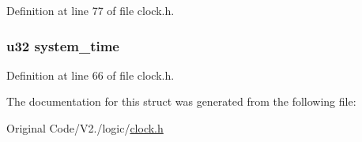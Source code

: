\-Definition at line 77 of file clock.\-h.

\hypertarget{structtime_a6a2672b74bddd00613c7fc2b4cd92b3b}{
\subsubsection[{system\-\_\-time}]{\setlength{\rightskip}{0pt plus 5cm}u32 {\bf system\-\_\-time}}}\label{structtime_a6a2672b74bddd00613c7fc2b4cd92b3b}


\-Definition at line 66 of file clock.\-h.



\-The documentation for this struct was generated from the following file\-:\begin{DoxyCompactItemize}
\item 
\-Original Code/\-V2./logic/\hyperlink{clock_8h}{clock.\-h}\end{DoxyCompactItemize}
